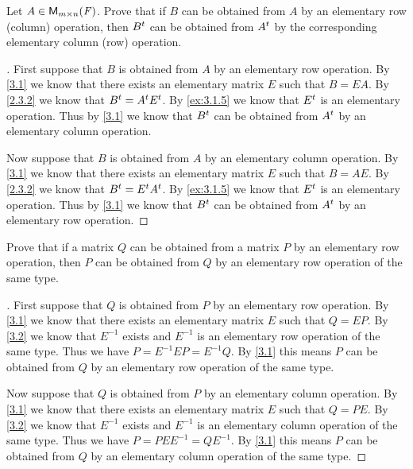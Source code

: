 \begin{ex}\label{ex:3.1.6}
	Let \(A \in \MS\).
	Prove that if \(B\) can be obtained from \(A\) by an elementary row (column) operation, then \({B}^{t}\) can be obtained from \({A}^{t}\) by the corresponding elementary column (row) operation.
\end{ex}

\begin{proof}[]
	First suppose that \(B\) is obtained from \(A\) by an elementary row operation.
	By \cref{3.1} we know that there exists an elementary matrix \(E\) such that \(B = EA\).
	By \cref{2.3.2} we know that \({B}^{t} = {A}^{t} {E}^{t}\).
	By \cref{ex:3.1.5} we know that \({E}^{t}\) is an elementary operation.
	Thus by \cref{3.1} we know that \({B}^{t}\) can be obtained from \({A}^{t}\) by an elementary column operation.

	Now suppose that \(B\) is obtained from \(A\) by an elementary column operation.
	By \cref{3.1} we know that there exists an elementary matrix \(E\) such that \(B = AE\).
	By \cref{2.3.2} we know that \({B}^{t} = {E}^{t} {A}^{t}\).
	By \cref{ex:3.1.5} we know that \({E}^{t}\) is an elementary operation.
	Thus by \cref{3.1} we know that \({B}^{t}\) can be obtained from \({A}^{t}\) by an elementary row operation.
\end{proof}

\setcounter{ex}{7}
\begin{ex}\label{ex:3.1.8}
	Prove that if a matrix \(Q\) can be obtained from a matrix \(P\) by an elementary row operation, then \(P\) can be obtained from \(Q\) by an elementary row operation of the same type.
\end{ex}

\begin{proof}[]
	First suppose that \(Q\) is obtained from \(P\) by an elementary row operation.
	By \cref{3.1} we know that there exists an elementary matrix \(E\) such that \(Q = EP\).
	By \cref{3.2} we know that \(E^{-1}\) exists and \(E^{-1}\) is an elementary row operation of the same type.
	Thus we have \(P = E^{-1} E P = E^{-1} Q\).
	By \cref{3.1} this means \(P\) can be obtained from \(Q\) by an elementary row operation of the same type.

	Now suppose that \(Q\) is obtained from \(P\) by an elementary column operation.
	By \cref{3.1} we know that there exists an elementary matrix \(E\) such that \(Q = PE\).
	By \cref{3.2} we know that \(E^{-1}\) exists and \(E^{-1}\) is an elementary column operation of the same type.
	Thus we have \(P = P E E^{-1} = Q E^{-1}\).
	By \cref{3.1} this means \(P\) can be obtained from \(Q\) by an elementary column operation of the same type.
\end{proof}

